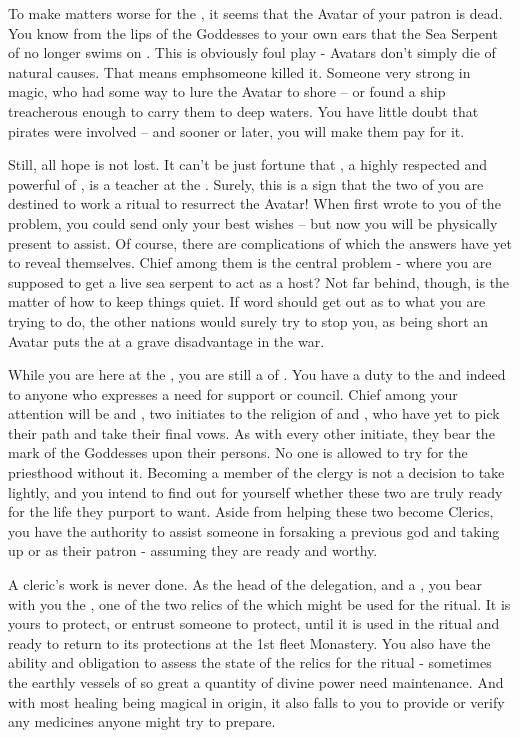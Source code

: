 \documentclass[char]{GL2020}
\begin{document}
To make matters worse for the \pShip{}, it seems that the Avatar of your patron \cFlow{\God} is dead. You know from the lips of the Goddesses to your own ears that the Sea Serpent of \cEbb{} no longer swims on \pEarth{}. This is obviously foul play - Avatars don’t simply die of natural causes. That means emph{someone} killed it. Someone very strong in magic, who had some way to lure the Avatar to shore -- or found a ship treacherous enough to carry them to deep waters. You have little doubt that pirates were involved -- and sooner or later, you will make them pay for it.

Still, all hope is not lost. It can’t be just fortune that \cFlowPriest{}, a highly respected and powerful \cFlowPriest{\cleric} of \cFlow{}, is a teacher at the \pSchool{}. Surely, this is a sign that the two of you are destined to work a ritual to resurrect the Avatar! When \cFlowPriest{} first wrote to you of the problem, you could send only your best wishes -- but now you will be physically present to assist. Of course, there are complications of which the answers have yet to reveal themselves. Chief among them is the central problem - where you are supposed to get a live sea serpent to act as a host? Not far behind, though, is the matter of how to keep things quiet. If word should get out as to what you are trying to do, the other nations would surely try to stop you, as being short an Avatar puts the \pShippies{} at a grave disadvantage in the war. 

While you are here at the \pSc{}, you are still a \cEbbPriest{\cleric} of \cEbb{}. You have a duty to the \pShippies{} and indeed to anyone who expresses a need for support or council. Chief among your attention will be \cInitiate{} and \cWarlordDaughter{}, two initiates to the religion of \cEbb{} and \cFlow{}, who have yet to pick their path and take their final vows. As with every other initiate, they bear the mark of the Goddesses upon their persons. No one is allowed to try for the priesthood without it. Becoming a member of the clergy is not a decision to take lightly, and you intend to find out for yourself whether these two are truly ready for the life they purport to want. Aside from helping these two become Clerics, you have the authority to assist someone in forsaking a previous god and taking up \cEbb{} or \cFlow{} as their patron - assuming they are ready and worthy.

A cleric’s work is never done. As the head of the delegation, and a \cEbbPriest{\cleric}, you bear with you the \iChalice{}, one of the two relics of the \pShip{} which might be used for the ritual. It is yours to protect, or entrust someone to protect, until it is used in the ritual and ready to return to its protections at the 1st fleet Monastery. You also have the ability and obligation to assess the state of the relics for the ritual - sometimes the earthly vessels of so great a quantity of divine power need maintenance. And with most healing being magical in origin, it also falls to you to provide or verify any medicines anyone might try to prepare.
\end{document}
